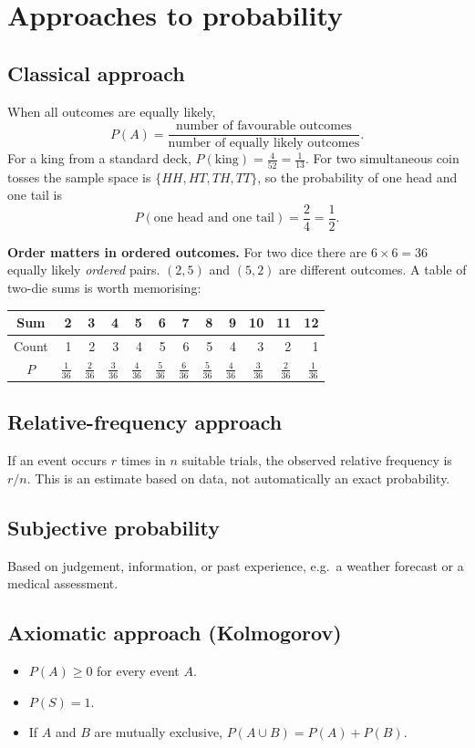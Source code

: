 \documentclass[11pt,a4paper]{article}
\begin{document}
\section{Approaches to probability}

\subsection{Classical approach}
When all outcomes are equally likely,
\[
P(A)=\frac{\text{number of favourable outcomes}}{\text{number of equally likely outcomes}}.
\]
For a king from a standard deck, $P(\text{king})=\frac{4}{52}=\frac{1}{13}$.
For two simultaneous coin tosses the sample space is $\{HH,HT,TH,TT\}$, so the
probability of one head and one tail is
\[
P(\text{one head and one tail})=\frac{2}{4}=\frac{1}{2}.
\]

\begin{exambox}
\textbf{Order matters in ordered outcomes.} For two dice there are $6\times6=36$ equally likely \emph{ordered} pairs. $(2,5)$ and $(5,2)$ are different outcomes. A table of two-die sums is worth memorising:
\begin{center}\small
\begin{tabular}{c|rrrrrrrrrrr}
\toprule Sum & 2&3&4&5&6&7&8&9&10&11&12\\\midrule
Count & 1&2&3&4&5&6&5&4&3&2&1\\
$P$ & $\frac1{36}$&$\frac2{36}$&$\frac3{36}$&$\frac4{36}$&$\frac5{36}$&$\frac6{36}$&$\frac5{36}$&$\frac4{36}$&$\frac3{36}$&$\frac2{36}$&$\frac1{36}$\\\bottomrule
\end{tabular}
\end{center}
\end{exambox}

\subsection{Relative-frequency approach}
If an event occurs $r$ times in $n$ suitable trials, the observed relative frequency is $r/n$. This is an estimate based on data, not automatically an exact probability.

\subsection{Subjective probability}
Based on judgement, information, or past experience, e.g.\ a weather forecast or a medical assessment.

\subsection{Axiomatic approach (Kolmogorov)}
\begin{itemize}
\item $P(A)\ge 0$ for every event $A$.
\item $P(S)=1$.
\item If $A$ and $B$ are mutually exclusive, $P(A\cup B)=P(A)+P(B)$.
\end{itemize}
\end{document}
